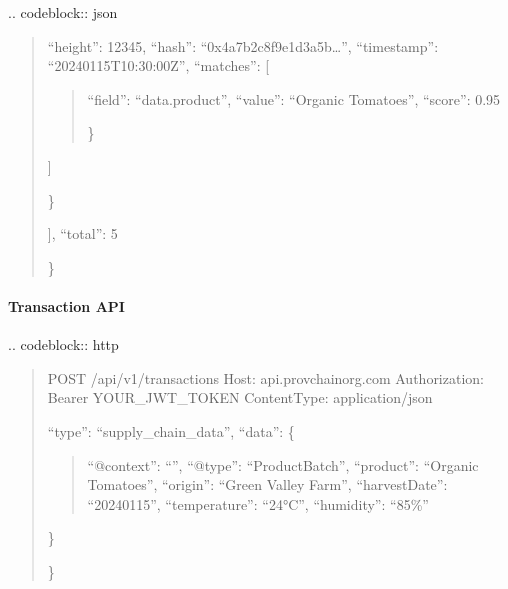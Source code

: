 \documentclass[letterpaper,10pt,english]{sphinxmanual}
\begin{document}
\sphinxAtStartPar
{}
.. code\sphinxhyphen{}block:: json
\begin{quote}
\begin{description}
\sphinxlineitem{\{}\begin{description}
\sphinxlineitem{“blocks”: {[}}\begin{description}
\sphinxlineitem{\{}
\sphinxAtStartPar
“height”: 12345,
“hash”: “0x4a7b2c8f9e1d3a5b…”,
“timestamp”: “2024\sphinxhyphen{}01\sphinxhyphen{}15T10:30:00Z”,
“matches”: {[}
\begin{quote}
\begin{description}
\sphinxlineitem{\{}
\sphinxAtStartPar
“field”: “data.product”,
“value”: “Organic Tomatoes”,
“score”: 0.95

\end{description}

\sphinxAtStartPar
\}
\end{quote}

\sphinxAtStartPar
{]}

\end{description}

\sphinxAtStartPar
\}

\end{description}

\sphinxAtStartPar
{]},
“total”: 5

\end{description}

\sphinxAtStartPar
\}
\end{quote}


\paragraph{Transaction API}
\label{\detokenize{api/index:transaction-api}}
\sphinxAtStartPar
{}
.. code\sphinxhyphen{}block:: http
\begin{quote}

\sphinxAtStartPar
POST /api/v1/transactions
Host: api.provchain\sphinxhyphen{}org.com
Authorization: Bearer YOUR\_JWT\_TOKEN
Content\sphinxhyphen{}Type: application/json
\begin{description}
\sphinxlineitem{\{}
\sphinxAtStartPar
“type”: “supply\_chain\_data”,
“data”: \{
\begin{quote}

\sphinxAtStartPar
“@context”: “”,
“@type”: “ProductBatch”,
“product”: “Organic Tomatoes”,
“origin”: “Green Valley Farm”,
“harvestDate”: “2024\sphinxhyphen{}01\sphinxhyphen{}15”,
“temperature”: “2\sphinxhyphen{}4°C”,
“humidity”: “85\%”
\end{quote}

\sphinxAtStartPar
\}

\end{description}

\sphinxAtStartPar
\}
\end{quote}
\end{document}
